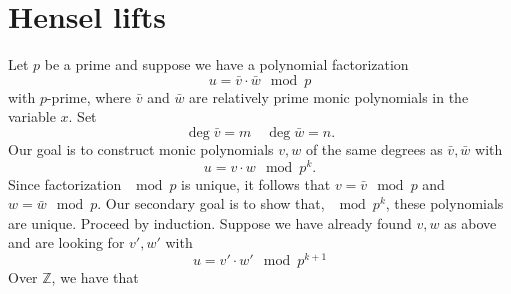 \documentclass{article}
\begin{document}
\section{Hensel lifts}
Let $p$ be a prime and suppose we have a polynomial factorization
\[
u = \bar v \cdot \bar w \mod p
\] with \(p\)-prime, where \(\bar v\) and \(\bar w\) are relatively prime monic polynomials in the variable \(x\). Set 
\[
\deg \bar v = m\quad \deg \bar  w = n.
\] 
Our goal is to construct monic polynomials \(v, w\) of the same degrees as \(\bar v,\bar  w\) with 
\[
u = v \cdot w \mod p^k.
\]
Since factorization $\mod p$ is unique, it follows that \(v =  \bar v \mod p \) and \(w = \bar w \mod p\). Our secondary goal is to show that, \(\mod p^{k}\), these polynomials are unique. Proceed by induction. Suppose we have already found \(v, w\) as above and are looking for \(v', w'\) with 
\[u = v'\cdot w' \mod p^{k+1}\]
Over $\mathbb Z$, we have that
\end{document}
